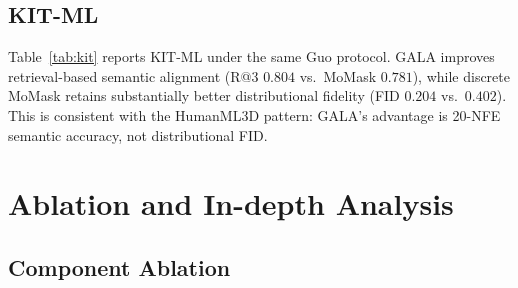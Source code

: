 \documentclass[journal]{IEEEtran}
\begin{document}
\subsection{KIT-ML}
\label{sec:main-kit}

Table~\ref{tab:kit} reports KIT-ML under the same Guo protocol. GALA improves retrieval-based semantic alignment (R@3 $0.804$ vs.\ MoMask $0.781$), while discrete MoMask retains substantially better distributional fidelity (FID $0.204$ vs.\ $0.402$). This is consistent with the HumanML3D pattern: GALA's advantage is 20-NFE semantic accuracy, not distributional FID.

\begin{table}[t]
\centering
\caption{KIT-ML test, Guo protocol; GALA uses 20 replications and 20 NFEs.}
\label{tab:kit}
\small
\setlength{\tabcolsep}{2.3pt}
\end{table}

\section{Ablation and In-depth Analysis}

\subsection{Component Ablation}
\label{sec:ablate}
\end{document}
